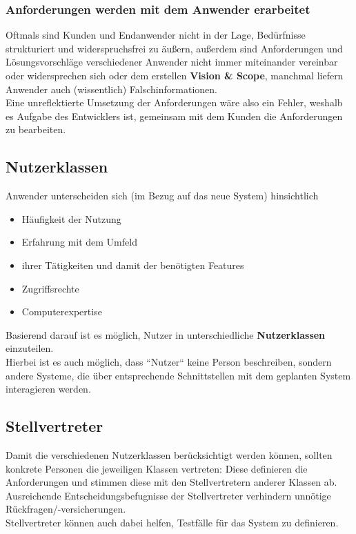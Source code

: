 \subsubsection*{Anforderungen werden mit dem Anwender erarbeitet}
Oftmals sind Kunden und Endanwender nicht in der Lage, Bedürfnisse strukturiert und widerspruchsfrei zu äußern, außerdem sind Anforderungen und Lösungsvorschläge verschiedener Anwender nicht immer miteinander vereinbar oder widersprechen sich oder dem erstellen \textbf{Vision \& Scope}, manchmal liefern Anwender auch (wissentlich) Falschinformationen.\\

\noindent
Eine unreflektierte Umsetzung der Anforderungen wäre also ein Fehler, weshalb es Aufgabe des Entwicklers ist, gemeinsam mit dem Kunden die Anforderungen zu bearbeiten.

\subsection*{Nutzerklassen}
Anwender unterscheiden sich (im Bezug auf das neue System) hinsichtlich

\begin{itemize}
    \item Häufigkeit der Nutzung
    \item Erfahrung mit dem Umfeld
    \item ihrer Tätigkeiten und damit der benötigten Features
    \item Zugriffsrechte
    \item Computerexpertise
\end{itemize}

\noindent
Basierend darauf ist es möglich, Nutzer in unterschiedliche \textbf{Nutzerklassen} einzuteilen.\\
Hierbei ist es auch möglich, dass ``Nutzer`` keine Person beschreiben, sondern andere Systeme, die über entsprechende Schnittstellen mit dem geplanten System interagieren werden.

\subsection*{Stellvertreter}
Damit die verschiedenen Nutzerklassen berücksichtigt werden können, sollten konkrete Personen die jeweiligen Klassen vertreten: Diese definieren die Anforderungen und stimmen diese mit den Stellvertretern anderer Klassen ab.\\
Ausreichende Entscheidungsbefugnisse der Stellvertreter verhindern unnötige Rückfragen/-versicherungen.\\
Stellvertreter können auch dabei helfen, Testfälle für das System zu definieren.


